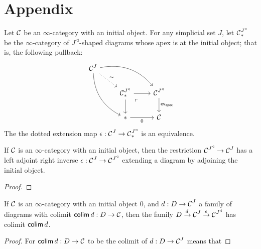 \section{Appendix}

\begin{lem}\label{lem:cone.initial.equivalence}
Let $\operatorname{\mathcal{C}}$ be an $\infty$-category with an initial object. For any simplicial set
$J$, let $\operatorname{\mathcal{C}}^{J^{\triangleleft}}_{\ast}$ be the $\infty$-category of
  $J^{\triangleleft}$-shaped diagrams whose apex is at the initial object; that
  is, the following pullback:
  \[
    \begin{tikzcd}
      \Ca^{J} \arrow[drr, bend left] \arrow[ddr, bend right] \arrow[dr,
      dotted, "\sim"] & & \\
      & \Ca^{J^{\triangleleft}}_{\ast} \arrow[d] \arrow[r] \arrow[dr, phantom,
      "\ulcorner" very near start] & \Ca^{J^{\triangleleft}} \arrow[d,
      "\term{ev}_{\term{apex}}"] \\
      & \ast \arrow[r, "0"'] & \Ca
    \end{tikzcd}
  \]
The the dotted extension map  $\epsilon : \operatorname{\mathcal{C}}^{J} \to \operatorname{\mathcal{C}}^{J^{\triangleleft}}_{\ast}$ is an equivalence.
\end{lem}

\begin{lem}\label{lem:kan.extending.cone.adds.initial}
If $\operatorname{\mathcal{C}}$ is an $\infty$-category with an initial object, then the restriction
$\operatorname{\mathcal{C}}^{J^{\triangleleft}} \to \operatorname{\mathcal{C}}^{J}$ has a left adjoint right inverse $\epsilon
: \operatorname{\mathcal{C}}^J \to \operatorname{\mathcal{C}}^{J^{\triangleleft}}$ extending a diagram by adjoining the
initial object. 
\end{lem}
\begin{proof}

\end{proof}


\begin{lem}
If $\operatorname{\mathcal{C}}$ is an $\infty$-category with an initial object $0$, and $d : D \to
\operatorname{\mathcal{C}}^J$ a family of diagrams with colimit $\operatorname{\mathsf{colim}} d : D \to \operatorname{\mathcal{C}}$, then the family
$D \xrightarrow{d} \operatorname{\mathcal{C}}^J \xrightarrow{\epsilon} \operatorname{\mathcal{C}}^{J^{\triangleleft}}$ has colimit $\operatorname{\mathsf{colim}} d$.
\end{lem}
\begin{proof}
For $\operatorname{\mathsf{colim}} d : D \to \operatorname{\mathcal{C}}$ to be the colimit of $d : D \to \operatorname{\mathcal{C}}^J$ means that 
\end{proof}

